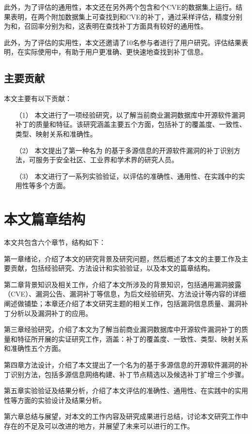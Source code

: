 此外，为了评估\tool 的通用性，本文还在另外两个包含和个CVE的数据集上运行\tool 。结果表明，\tool 在两个附加数据集上可查找到和CVE的补丁，通过采样评估，精度分别为和，召回率分别为和，这表明\tool 在查找补丁方面具有较好的通用性。

此外，为了评估\tool 的实用性，本文还邀请了10名参与者进行了用户研究。评估结果表明，在实际使用中，\tool 有助于用户更准确、更快速地查找到补丁信息。

\subsection{主要贡献}
本文主要有以下贡献：
\begin{enumerate}
\item [（1）]本文进行了一项经验研究，以了解当前商业漏洞数据库中开源软件漏洞补丁的质量和特征。该研究涵盖主要五个方面，包括补丁的覆盖度、一致性、类型、映射关系和准确性。
\item [（2）]本文提出了第一种名为 \tool 的基于多源信息的开源软件漏洞的补丁识别方法，可服务于安全社区、工业界和学术界的研究人员。
\item [（3）]本文进行了一系列实验验证，以评估\tool 的准确性、通用性、在实践中的实用性等多个方面。
\end{enumerate}


\section{本文篇章结构}
本文共包含六个章节，结构如下：

第一章绪论，介绍了本文的研究背景及研究问题，然后概述了本文的主要工作及主要贡献，包括经验研究、方法设计和实验验证，以及本文的篇章结构。

第二章背景知识及相关工作，介绍了本文所涉及的背景知识，包括通用漏洞披露（CVE）、漏洞公告、漏洞补丁等信息，为后文经验研究、方法设计等内容的详细阐述做铺垫；本章还介绍了本文研究主题的相关工作，包括漏洞信息质量、漏洞补丁分析以及漏洞补丁的应用。

第三章经验研究，介绍了本文为了解当前商业漏洞数据库中开源软件漏洞补丁的质量和特征所开展的实证研究工作，涵盖：补丁的覆盖度、一致性、类型、映射关系和准确性五个方面。

第四章\tool 方法设计，介绍了本文提出了一个名为\tool 的基于多源信息的开源软件漏洞的补丁识别方法，包括多源信息网络构建、补丁节点精选以及候选补丁扩增三个步骤。

第五章实验验证及结果分析，介绍了本文评估\tool 的准确性、通用性、在实践中的实用性等方面的实验设计及结果分析。

第六章总结与展望，对本文的工作内容及研究成果进行总结，讨论本文研究工作中存在的不足及可以改进的地方，并展望了未来可以进行的工作。

